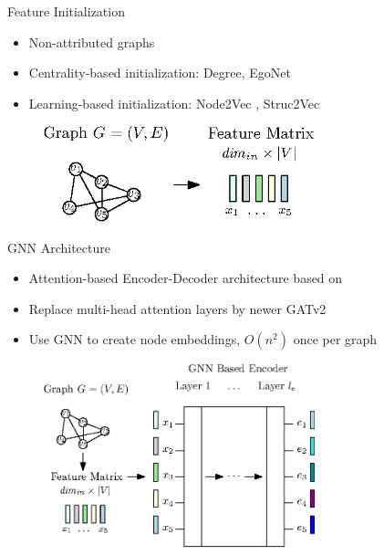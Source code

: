 \documentclass{beamer}
\begin{document}
\begin{frame}{Feature Initialization}
    \begin{itemize}
        \item<1-> Non-attributed graphs
        \item<2-> Centrality-based initialization: Degree, EgoNet
        \item<3-> Learning-based initialization: Node2Vec \cite{GroverL16}, Struc2Vec \cite{FigueiredoRS17}
    \end{itemize}
    \begin{figure}
        \centering
        \includegraphics[width=0.7\textwidth]{graphics/architecture-1.eps}
    \end{figure}
\end{frame}

\begin{frame}{GNN Architecture}
    \begin{itemize}
        \item Attention-based Encoder-Decoder architecture based on \cite{Kool2019}
        \item Replace multi-head attention layers by newer GATv2 \cite{Brody2021} 
        \item Use GNN to create node embeddings, $O(n^2)$ once per graph
    \end{itemize}
    \begin{figure}
        \centering
        \includegraphics[width=0.7\textwidth]{graphics/architecture-2.eps}
    \end{figure}
\end{frame}
\end{document}
